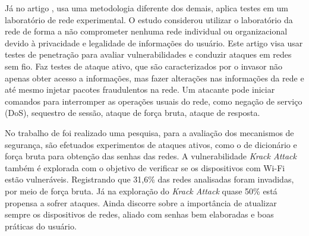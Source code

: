 \documentclass[
	article,			%
	11pt,				%
	oneside,			%
	a4paper,			%
	english,			%
	brazil,				%
	sumario=tradicional
	]{abntex2}
\begin{document}
Já no artigo \cite{kissi975penetration}, usa uma metodologia diferente dos demais, aplica testes em um laboratório de rede experimental. O estudo considerou utilizar o laboratório da rede de forma a não comprometer nenhuma rede individual ou organizacional devido à privacidade e legalidade de informações do usuário. Este artigo visa usar testes de penetração para avaliar vulnerabilidades e conduzir ataques em redes sem fio. Faz testes de ataque ativo, que são caracterizados por o invasor não apenas obter acesso a informações, mas fazer alterações nas informações da rede e até mesmo injetar pacotes fraudulentos na rede. Um atacante pode iniciar comandos para interromper as operações usuais do rede, como negação de serviço (DoS), sequestro de sessão, ataque de força bruta, ataque de resposta. 

No trabalho de  foi realizado uma pesquisa, para a avaliação dos mecanismos de segurança, são efetuados experimentos de ataques ativos, como o de dicionário e força bruta para obtenção das senhas das redes. A vulnerabilidade \textit{Krack Attack} também é explorada com o objetivo de verificar se os dispositivos com Wi-Fi estão vulneráveis. Registrando que 31,6\% das redes analisadas foram invadidas, por meio de força bruta. Já na exploração do \textit{Krack Attack} quase 50\% está propensa a sofrer ataques. Ainda discorre sobre a importância de atualizar sempre os dispositivos de redes, aliado com senhas bem elaboradas e boas práticas do usuário.
\end{document}
